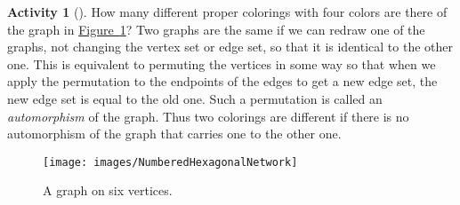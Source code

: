 \documentclass[10pt,]{book}
\theoremstyle{plain}
\theoremstyle{definition}
\newtheorem{activity}[project]{Activity}
\numberwithin{equation}{chapter}
\begin{document}
\begin{activity}[]\label{activity-317}
How many different proper colorings with four colors are there of the graph in \hyperref[starhexagon]{Figure~\ref{starhexagon}}? Two graphs are the same if we can redraw one of the graphs, not changing the vertex set or edge set, so that it is identical to the other one. This is equivalent to permuting the vertices in some way so that when we apply the permutation to the endpoints of the edges to get a new edge set, the new edge set is equal to the old one. Such a permutation is called an \emph{automorphism} of the graph. Thus two colorings are different if there is no automorphism of the graph that carries one to the other one.%
\begin{figure}
\centering
\texttt{[image: images/NumberedHexagonalNetwork]}
\caption{A graph on six vertices.\label{starhexagon}}
\end{figure}
\par\medskip\noindent%

\end{activity}
\end{document}
